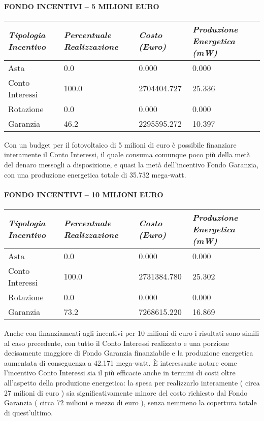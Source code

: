 \documentclass[12pt,a4paper,openright,twoside]{report}
\begin{document}
\paragraph{FONDO INCENTIVI – 5 MILIONI EURO}
\begin{center}
	\begin{tabular}{ | p{3.5cm} | p{3.5cm} | p{3.5cm} | p{3.5cm} | }
		\hline
		\nohyphens{\emph{Tipologia Incentivo}} & \nohyphens{\emph{Percentuale Realizzazione}} & \nohyphens{\emph{Costo (Euro)}} & \nohyphens{\emph{Produzione Energetica (mW)}} \\ \hline
		Asta & 0.0 & 0.000 & 0.000 \\ \hline
		Conto Interessi & 100.0 & 2704404.727 & 25.336 \\ \hline
		Rotazione & 0.0 & 0.000 & 0.000 \\ \hline
		Garanzia & 46.2 & 2295595.272 & 10.397 \\
		\hline
	\end{tabular}
\end{center}
Con un budget per il fotovoltaico di 5 milioni di euro è possibile finanziare interamente il Conto Interessi, il quale consuma comunque poco più della metà del denaro messogli a disposizione, e quasi la metà dell'incentivo Fondo Garanzia, con una produzione energetica totale di 35.732 mega-watt.
\paragraph{FONDO INCENTIVI – 10 MILIONI EURO}
\begin{center}
	\begin{tabular}{ | p{3.5cm} | p{3.5cm} | p{3.5cm} | p{3.5cm} | }
		\hline
		\nohyphens{\emph{Tipologia Incentivo}} & \nohyphens{\emph{Percentuale Realizzazione}} & \nohyphens{\emph{Costo (Euro)}} & \nohyphens{\emph{Produzione Energetica (mW)}} \\ \hline
		Asta & 0.0 & 0.000 & 0.000 \\ \hline
		Conto Interessi & 100.0 & 2731384.780 & 25.302 \\ \hline
		Rotazione & 0.0 & 0.000 & 0.000 \\ \hline
		Garanzia & 73.2 & 7268615.220 & 16.869 \\
		\hline
	\end{tabular}
\end{center}
Anche con finanziamenti agli incentivi per 10 milioni di euro i risultati sono simili al caso precedente, con tutto il Conto Interessi realizzato e una porzione decisamente maggiore di Fondo Garanzia finanziabile e la produzione energetica aumentata di conseguenza a 42.171 mega-watt.
È interessante notare come l'incentivo Conto Interessi sia il più efficacie anche in termini di costi oltre all'aspetto della produzione energetica: la spesa per realizzarlo interamente ( circa 27 milioni di euro ) sia significativamente minore del costo richiesto dal Fondo Garanzia ( circa 72 milioni e mezzo di euro ), senza nemmeno la copertura totale di quest'ultimo.
\end{document}
